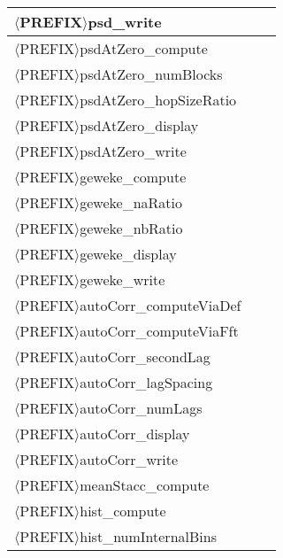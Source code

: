 \begin{table}[!h]
\begin{center}
\begin{tabular}{|l|c|c|}
\hline
$\langle$PREFIX$\rangle$psd\_write                 &         &             \\
\hline
\hline
$\langle$PREFIX$\rangle$psdAtZero\_compute         &         &             \\
\hline
$\langle$PREFIX$\rangle$psdAtZero\_numBlocks       &         &             \\
\hline
$\langle$PREFIX$\rangle$psdAtZero\_hopSizeRatio    &         &             \\
\hline
$\langle$PREFIX$\rangle$psdAtZero\_display         &         &             \\
\hline
$\langle$PREFIX$\rangle$psdAtZero\_write           &         &             \\
\hline
\hline
$\langle$PREFIX$\rangle$geweke\_compute            &         &             \\
\hline
$\langle$PREFIX$\rangle$geweke\_naRatio            &         &             \\
\hline
$\langle$PREFIX$\rangle$geweke\_nbRatio            &         &             \\
\hline
$\langle$PREFIX$\rangle$geweke\_display            &         &             \\
\hline
$\langle$PREFIX$\rangle$geweke\_write              &         &             \\
\hline
\hline
$\langle$PREFIX$\rangle$autoCorr\_computeViaDef    &         &             \\
\hline
$\langle$PREFIX$\rangle$autoCorr\_computeViaFft    &         &             \\
\hline
$\langle$PREFIX$\rangle$autoCorr\_secondLag        &         &             \\
\hline
$\langle$PREFIX$\rangle$autoCorr\_lagSpacing       &         &             \\
\hline
$\langle$PREFIX$\rangle$autoCorr\_numLags          &         &             \\
\hline
$\langle$PREFIX$\rangle$autoCorr\_display          &         &             \\
\hline
$\langle$PREFIX$\rangle$autoCorr\_write            &         &             \\
\hline
\hline
$\langle$PREFIX$\rangle$meanStacc\_compute         &         &             \\
\hline
\hline
$\langle$PREFIX$\rangle$hist\_compute              &         &             \\
\hline
$\langle$PREFIX$\rangle$hist\_numInternalBins      &         &             \\

\end{tabular}
\end{center}
\end{table}
